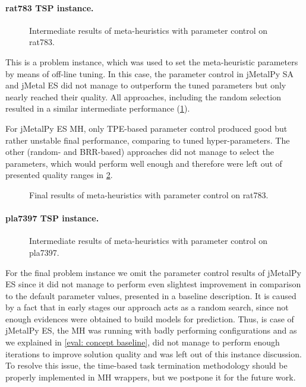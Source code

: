 \newpage
\paragraph{rat783 TSP instance.}
\begin{figure}[t]
	\centering
	
	\caption{Intermediate results of meta-heuristics with parameter control on rat783.}
	\label{eval:pict:pc:rat783 intermediate}
\end{figure}

This is a problem instance, which was used to set the meta-heuristic parameters by means of off-line tuning. In this case, the parameter control in jMetalPy SA and jMetal ES did not manage to outperform the tuned parameters but only nearly reached their quality. All approaches, including the random selection resulted in a similar intermediate performance (\cref{eval:pict:pc:rat783 intermediate}).

For jMetalPy ES MH, only TPE-based parameter control produced good but rather unstable final performance, comparing to tuned hyper-parameters. The other (random- and BRR-based) approaches did not manage to select the parameters, which would perform well enough and therefore were left out of presented quality ranges in \cref{eval:pict:pc:rat783 final}.

\begin{figure}[b]
	\centering
	
	\caption{Final results of meta-heuristics with parameter control on rat783.}
	\label{eval:pict:pc:rat783 final}
\end{figure}

\newpage
\paragraph{pla7397 TSP instance.}
\begin{figure}[t]
	\centering
	
	\caption{Intermediate results of meta-heuristics with parameter control on pla7397.}
	\label{eval:pict:pc:pla7397 intermediate}
\end{figure}

For the final problem instance we omit the parameter control results of jMetalPy ES since it did not manage to perform even slightest improvement in comparison to the default parameter values, presented in a baseline description. It is caused by a fact that in early stages our approach acts as a random search, since not enough evidences were obtained to build models for prediction. Thus, is case of jMetalPy ES, the MH was running with badly performing configurations and as we explained in \cref{eval: concept baseline}, did not manage to perform enough iterations to improve solution quality and was left out of this instance discussion. To resolve this issue, the time-based task termination methodology should be properly implemented in MH wrappers, but we postpone it for the future work.

